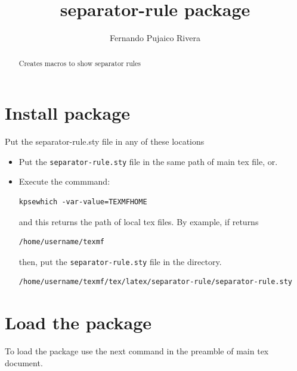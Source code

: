 \documentclass[a4paper,10pt]{article}
\title{separator-rule package}
\author{Fernando Pujaico Rivera}
\begin{document}
\maketitle

\begin{abstract}
Creates macros to show separator rules
\end{abstract}

\section{Install package}
Put the separator-rule.sty file in any of these locations
\begin{itemize}
\item Put the \texttt{separator-rule.sty} file in the same path of main tex file, or.
\item Execute the commmand:
\begin{mdframed}[backgroundcolor=black!10,rightline=false,leftline=false]
\begin{verbatim}
kpsewhich -var-value=TEXMFHOME
\end{verbatim}
\end{mdframed}
and this returns the path of local tex files. By example, if returns 
\begin{mdframed}[backgroundcolor=black!10,rightline=false,leftline=false]
\begin{verbatim}
/home/username/texmf
\end{verbatim}
\end{mdframed}
then, put the \texttt{separator-rule.sty} file in the directory.
\begin{mdframed}[backgroundcolor=black!10,rightline=false,leftline=false]
\begin{verbatim}
/home/username/texmf/tex/latex/separator-rule/separator-rule.sty
\end{verbatim}
\end{mdframed}
\end{itemize}
\vspace{-2ex}


\vspace{-2ex}
\section{Load the package}
To load the package use the next command in the preamble of main tex document.
\end{document}
